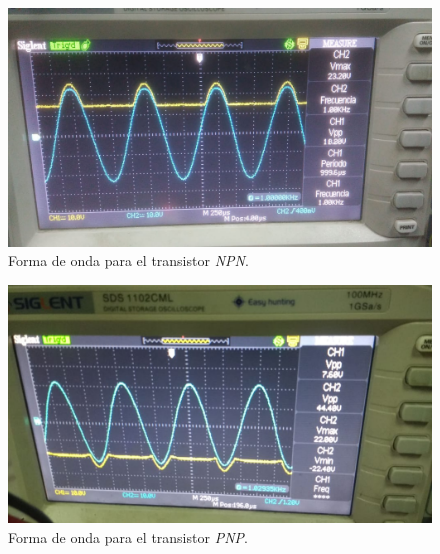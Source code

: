 \begin{figure}[H]
        \centering
        \includegraphics[width=0.95 \textwidth]{./img/mediciones/Switching/2.jpeg}
        \caption{Forma de onda para el transistor \textit{NPN}.}
        \label{fig:switch1}
\end{figure}

\vfill

\clearpage

\begin{figure}[H]
        \centering
        \includegraphics[width=0.95 \textwidth]{./img/mediciones/Switching/1.jpeg}
        \caption{Forma de onda para el transistor \textit{PNP}.}
        \label{fig:switch2}
\end{figure}


\vfill

\clearpage


